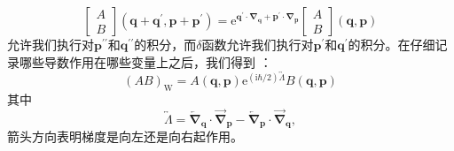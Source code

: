 \begin{equation}
\begin{bmatrix}A\\
B
\end{bmatrix}(\boldsymbol{q}+\boldsymbol{q}^{\prime},\boldsymbol{p}+\boldsymbol{p}^{\prime})=\mathrm{e}^{\boldsymbol{q}^{\prime}\cdot\boldsymbol{\nabla}_{\boldsymbol{q}}+\boldsymbol{p}^{\prime}\cdot\boldsymbol{\nabla}_{\boldsymbol{p}}}\begin{bmatrix}A\\
B
\end{bmatrix}(\boldsymbol{q},\boldsymbol{p})\label{eq:appendix_d_taylor_operator}
\end{equation}
允许我们执行对$\boldsymbol{p}^{\prime\prime}$和$\boldsymbol{q}^{\prime\prime}$的积分，而$\delta$函数允许我们执行对$\boldsymbol{p}^{\prime}$和$\boldsymbol{q}^{\prime}$的积分。在仔细记录哪些导数作用在哪些变量上之后，我们得到
\cite{Gr46,KK76,Vo77,BP77b}：
\begin{equation}
(AB)_{\text{W}}=A(\boldsymbol{q},\boldsymbol{p})\mathrm{e}^{(\mathrm{i}\hbar/2)\overleftrightarrow{\Lambda}}B(\boldsymbol{q},\boldsymbol{p})\label{eq:appendix_d_moyal_product}
\end{equation}
其中
\begin{equation}
\overleftrightarrow{\Lambda}=\overleftarrow{\boldsymbol{\nabla}}_{\boldsymbol{q}}\cdot\overrightarrow{\boldsymbol{\nabla}}_{\boldsymbol{p}}-\overleftarrow{\boldsymbol{\nabla}}_{\boldsymbol{p}}\cdot\overrightarrow{\boldsymbol{\nabla}}_{\boldsymbol{q}},\label{eq:appendix_d_lambda_operator}
\end{equation}
箭头方向表明梯度是向左还是向右起作用。

